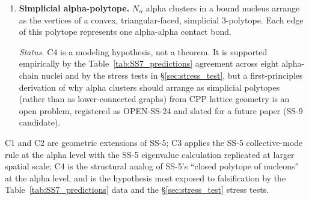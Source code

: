 \documentclass[11pt,letterpaper]{article}
\newcommand{\Nalpha}{N_{\alpha}}
\begin{document}
\begin{enumerate}[label=(C\arabic*)]
\item \textbf{Simplicial alpha-polytope.} $\Nalpha$ alpha clusters in a bound nucleus arrange as the vertices of a convex, triangular-faced, simplicial 3-polytope. Each edge of this polytope represents one alpha-alpha contact bond.

\emph{Status.} C4 is a modeling hypothesis, not a theorem. It is supported empirically by the Table~\ref{tab:SS7_predictions} agreement across eight alpha-chain nuclei and by the stress tests in \S\ref{sec:stress_test}, but a first-principles derivation of why alpha clusters should arrange as simplicial polytopes (rather than as lower-connected graphs) from CPP lattice geometry is an open problem, registered as OPEN-SS-24 and slated for a future paper (SS-9 candidate).
\end{enumerate}

C1 and C2 are geometric extensions of SS-5; C3 applies the SS-5 collective-mode rule at the alpha level with the SS-5 eigenvalue calculation replicated at larger spatial scale; C4 is the structural analog of SS-5's ``closed polytope of nucleons'' at the alpha level, and is the hypothesis most exposed to falsification by the Table~\ref{tab:SS7_predictions} data and the \S\ref{sec:stress_test} stress tests.
\end{document}
